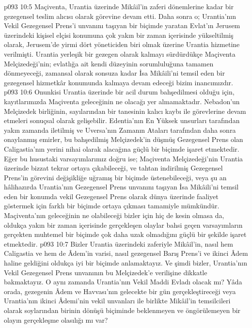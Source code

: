 \vs p093 10:5 Maçiventa, Urantia üzerinde Mikâil’in zaferi dönemlerine kadar bir gezegensel teslim alıcısı olarak görevine devam etti. Daha sonra o; Urantia’nın Vekil Gezegensel Prens’i unvanını taşıyan bir biçimde yaratan Evlat’ın Jerusem üzerindeki kişisel elçisi konumuna çok yakın bir zaman içerisinde yükseltilmiş olarak, Jerusem’de yirmi dört yöneticiden biri olmak üzerine Urantia hizmetine verilmişti. Urantia yerleşik bir gezegen olarak kalmayı sürdürdükçe Maçiventa Melçizedeği’nin; evlatlığa ait kendi düzeyinin sorumluluğuna tamamen dönmeyeceği, zamansal olarak sonsuza kadar İsa Mikâili’ni temsil eden bir gezegensel hizmetkâr konumunda kalmaya devam edeceği bizim inancımızdır.
\vs p093 10:6 Onunkisi Urantia üzerinde bir acil durum bahşedilmesi olduğu için, kayıtlarımızda Maçiventa geleceğinin ne olacağı yer almamaktadır. Nebadon’un Melçizedek birliğinin, sayılarından bir tanesinin kalıcı kaybı ile görevlerine devam etmeleri sonuçsal olarak gelişebilir. Edentia’nın En Yüksek unsurları tarafından yakın zamanda iletilmiş ve Uversa’nın Zamanın Ataları tarafından daha sonra onaylanmış emirler, bu bahşedilmiş Melçizedek’in düşmüş Gezegensel Prens olan Caligastia’nın yerini nihai olarak alacağına güçlü bir biçimde işaret etmektedir. Eğer bu husustaki varsayımlarımız doğru ise; Maçiventa Melçizedeği’nin Urantia üzerinde bizzat tekrar ortaya çıkabileceği, ve tahtan indirilmiş Gezegensel Prens’in görevini değişikliğe uğramış bir biçimde üstenebileceği, veya şu an hâlihazırda Urantia’nın Gezegensel Prens unvanını taşıyan İsa Mikâili’ni temsil eden bir konumda vekil Gezegensel Prens olarak dünya üzerinde faaliyet göstermek için farklı bir biçimde ortaya çıkması tamamiyle mümkündür. Maçiventa’nın geleceğinin ne olabileceği bizler için hiç de kesin olmasa da, oldukça yakın bir zaman içerisinde gerçekleşen olaylar bahsi geçen varsayımların gerçekten muhtemel bir biçimde çok daha uzak olmadığını güçlü bir şekilde işaret etmektedir.
\vs p093 10:7 Bizler Urantia üzerindeki zaferiyle Mikâil’in, nasıl hem Caligastia ve hem de Âdem’in varisi, nasıl gezegensel Barış Prens’i ve ikinci Âdem haline geldiğini oldukça iyi bir biçimde anlamaktayız. Ve şimdi bizler, Urantia’nın Vekil Gezegensel Prens unvanının bu Melçizedek’e verilişine dikkatle bakmaktayız. O aynı zamanda Urantia’nın Vekil Maddi Evladı olacak mı? Yâda orada, gezegenin Âdem ve Havvası’nın gelecekte bir gün gerçekleştireceği veya Urantia’nın ikinci Âdemi’nin vekil unvanları ile birlikte Mikâil’in temsilcileri olarak soylarından birinin dönüşü biçiminde beklenmeyen ve öngörülemeyen bir olayın gerçekleşme olasılığı mı var?
